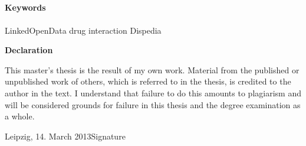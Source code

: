 \documentclass[%
  parskip=half,
  ]{scrreprt} %
\title{%
\dipltitle\\%
\bigskip\usekomafont{subtitle}%
\parbox[h]{0.8\textwidth}{\begin{center}\diplsubtitle\end{center}}%
}
\subtitle{\usekomafont{subject}\vspace{3em}\diplsubject}
\author{}
\date{}
\newcommand{\rem}[1]{\textcolor{remcolor}{\emph{#1}}}
\begin{document}

\ifpdf
{}
\else
{}
\fi


\maketitle





\paragraph{Keywords} LinkedOpenData drug interaction Dispedia

\setcounter{tocdepth}{1}
\tableofcontents

\clearpage














\appendix



%


\listoffigures
\listoftables

\clearpage
\pagestyle{empty}
\vspace*{1cm}
\begin{center}
\textbf{\sffamily Declaration}
\end{center}
\vspace*{0.5cm}
This master's thesis is the result of my own work. Material from the published or unpublished work of others, which is referred to in the thesis, is credited to the author in the text. I understand that failure to do this amounts to plagiarism and will be considered grounds for failure in this thesis and the degree examination as a whole.

\vspace{2cm}
\noindent
Leipzig, 14. March 2013\hfill Signature
\end{document}
